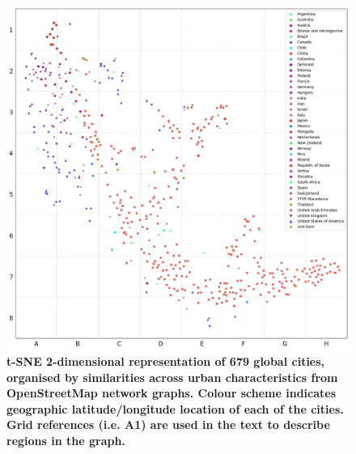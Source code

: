 \documentclass[preprint,12pt]{elsarticle}
\begin{document}
\begin{figure}
\centering
\includegraphics[trim={ 0 0 0 0 },clip,scale=0.45]{Images/ByCountry_latlong_Zeigler.png}%
\caption{\bf t-SNE 2-dimensional representation of 679 global cities, organised by similarities across urban characteristics from OpenStreetMap network graphs. Colour scheme indicates geographic latitude/longitude location\cite{Jackle2017} of each of the cities. Grid references (i.e. A1) are used in the text to describe regions in the graph.}
 \label{fig:tSNE}
\end{figure}




\end{document}
